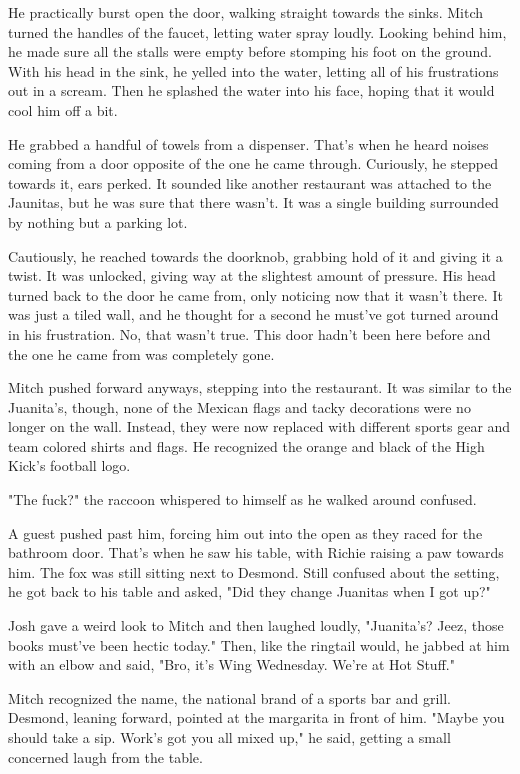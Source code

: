 He practically burst open the door, walking straight towards the sinks. Mitch turned the handles of the faucet, letting water spray loudly. Looking behind him, he made sure all the stalls were empty before stomping his foot on the ground. With his head in the sink, he yelled into the water, letting all of his frustrations out in a scream. Then he splashed the water into his face, hoping that it would cool him off a bit.

He grabbed a handful of towels from a dispenser. That's when he heard noises coming from a door opposite of the one he came through. Curiously, he stepped towards it, ears perked. It sounded like another restaurant was attached to the Jaunitas, but he was sure that there wasn't. It was a single building surrounded by nothing but a parking lot.

Cautiously, he reached towards the doorknob, grabbing hold of it and giving it a twist. It was unlocked, giving way at the slightest amount of pressure. His head turned back to the door he came from, only noticing now that it wasn't there. It was just a tiled wall, and he thought for a second he must've got turned around in his frustration. No, that wasn't true. This door hadn't been here before and the one he came from was completely gone.

Mitch pushed forward anyways, stepping into the restaurant. It was similar to the Juanita's, though, none of the Mexican flags and tacky decorations were no longer on the wall. Instead, they were now replaced with different sports gear and team colored shirts and flags. He recognized the orange and black of the High Kick's football logo.

"The fuck?" the raccoon whispered to himself as he walked around confused.

A guest pushed past him, forcing him out into the open as they raced for the bathroom door. That's when he saw his table, with Richie raising a paw towards him. The fox was still sitting next to Desmond. Still confused about the setting, he got back to his table and asked, "Did they change Juanitas when I got up?"

Josh gave a weird look to Mitch and then laughed loudly, "Juanita's? Jeez, those books must've been hectic today." Then, like the ringtail would, he jabbed at him with an elbow and said, "Bro, it's Wing Wednesday. We're at Hot Stuff."

Mitch recognized the name, the national brand of a sports bar and grill. Desmond, leaning forward, pointed at the margarita in front of him. "Maybe you should take a sip. Work's got you all mixed up," he said, getting a small concerned laugh from the table.

